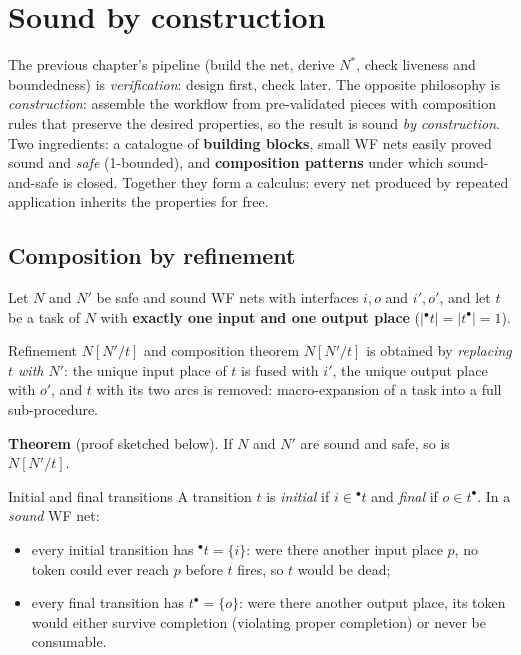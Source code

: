 \section{Sound by construction}

The previous chapter's pipeline (build the net, derive $N^*$, check liveness and boundedness) is \emph{verification}: design first, check later. The opposite philosophy is \emph{construction}: assemble the workflow from pre-validated pieces with composition rules that preserve the desired properties, so the result is sound \emph{by construction}. Two ingredients: a catalogue of \textbf{building blocks}, small WF nets easily proved sound and \emph{safe} (1-bounded), and \textbf{composition patterns} under which sound-and-safe is closed. Together they form a calculus: every net produced by repeated application inherits the properties for free.

\subsection{Composition by refinement}

Let $N$ and $N'$ be safe and sound WF nets with interfaces $i, o$ and $i', o'$, and let $t$ be a task of $N$ with \textbf{exactly one input and one output place} ($|{}^\bullet t| = |t^\bullet| = 1$).

\begin{definitionbox}{Refinement $N[N'/t]$ and composition theorem}
$N[N'/t]$ is obtained by \emph{replacing $t$ with $N'$}: the unique input place of $t$ is fused with $i'$, the unique output place with $o'$, and $t$ with its two arcs is removed: macro-expansion of a task into a full sub-procedure.
\par\smallskip
\textbf{Theorem} (proof sketched below). If $N$ and $N'$ are sound and safe, so is $N[N'/t]$.
\end{definitionbox}

\begin{definitionbox}{Initial and final transitions}
A transition $t$ is \emph{initial} if $i \in {}^\bullet t$ and \emph{final} if $o \in t^\bullet$. In a \emph{sound} WF net:
\begin{itemize}
  \item every initial transition has ${}^\bullet t = \{i\}$: were there another input place $p$, no token could ever reach $p$ before $t$ fires, so $t$ would be dead;
  \item every final transition has $t^\bullet = \{o\}$: were there another output place, its token would either survive completion (violating proper completion) or never be consumable.
\end{itemize}
\end{definitionbox}

